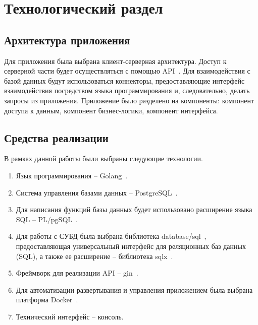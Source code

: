 \section{Технологический раздел}

\subsection{Архитектура приложения}

Для приложения была выбрана клиент-серверная архитектура. Доступ к серверной части будет осуществляться с помощью API~\cite{api}. Для взаимодействия с базой данных будут использоваться коннекторы, предоставляющие интерфейс взаимодействия посредством языка программирования и, следовательно,  делать запросы из приложения. Приложение было разделено на компоненты: компонент доступа к данным, компонент бизнес-логики, компонент интерфейса. 



\newpage

\subsection{Средства реализации}

В рамках данной работы были выбраны следующие технологии.
\begin{enumerate}[label=\arabic*)]
	\item Язык программирования -- Golang~\cite{go}.
	\item Система управления базами данных -- PostgreSQL~\cite{postgres}. 
	\item Для написания функций базы данных будет использовано расширение языка SQL -- PL/pgSQL~\cite{pgSQL}.
	\item Для работы с СУБД была выбрана библиотека database/sql~\cite{go-sql}, предоставляющая универсальный интерфейс для реляционных баз данных (SQL), а также ее расширение -- библиотека sqlx~\cite{sqlx}.
	\item Фреймворк для реализации API -- gin~\cite{gin}.
	\item Для автоматизации развертывания и управления приложением была выбрана платформа Docker~\cite{docker}. 
	\item Технический интерфейс -- консоль. 
\end{enumerate}

